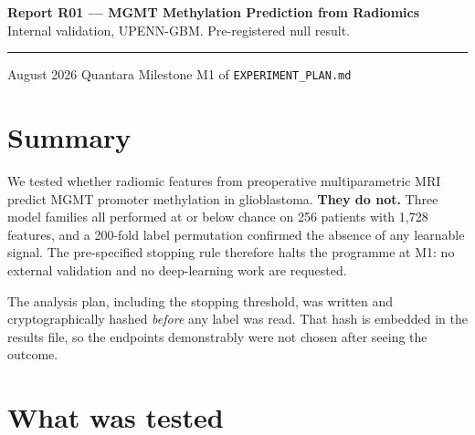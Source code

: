 \documentclass[11pt,a4paper]{article}
\begin{document}
\thispagestyle{empty}

\noindent
{\large\bfseries\color{qnavy} Report R01 --- MGMT Methylation Prediction from Radiomics}\\[2pt]
{\color{qgrey}Internal validation, UPENN-GBM. Pre-registered null result.}\\[6pt]
{\color{qgrey}\rule{\textwidth}{0.4pt}}

\medskip
{} August 2026 \quad\textbullet\quad Quantara \quad\textbullet\quad
Milestone M1 of \texttt{EXPERIMENT\_PLAN.md}

\section*{Summary}

We tested whether radiomic features from preoperative multiparametric MRI predict MGMT
promoter methylation in glioblastoma. \textbf{They do not.} Three model families all
performed at or below chance on 256 patients with 1{,}728 features, and a 200-fold label
permutation confirmed the absence of any learnable signal. The pre-specified stopping rule
therefore halts the programme at M1: no external validation and no deep-learning work are
requested.

The analysis plan, including the stopping threshold, was written and cryptographically
hashed \emph{before} any label was read. That hash is embedded in the results file, so the
endpoints demonstrably were not chosen after seeing the outcome.

\section{What was tested}
\end{document}
